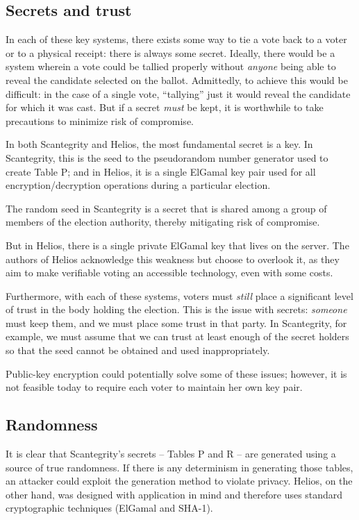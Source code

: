 \documentclass[10pt,twocolumn]{article}
\begin{document}
\subsection{Secrets and trust}

In each of these key systems, there exists some way to tie a vote back to a voter or to a physical
receipt: there is always some secret. Ideally, there would be a system wherein a vote could be
tallied properly without \emph{anyone} being able to reveal the candidate selected on the ballot.
Admittedly, to achieve this would be difficult: in the case of a single vote, ``tallying'' just it
would reveal the candidate for which it was cast. But if a secret \emph{must} be kept, it is
worthwhile to take precautions to minimize risk of compromise.

In both Scantegrity and Helios, the most fundamental secret is a key. In Scantegrity, this is the
seed to the pseudorandom number generator used to create Table P; and in Helios, it is a single
ElGamal key pair used for all encryption/decryption operations during a particular election.

The random seed in Scantegrity is a secret that is shared among a group of members of the election
authority, thereby mitigating risk of compromise.

But in Helios, there is a single private ElGamal key that lives on the server. The
authors of Helios acknowledge this weakness but choose to overlook it, as they aim to make
verifiable voting an accessible technology, even with some costs.

Furthermore, with each of these systems, voters must \emph{still} place a significant level of trust
in the body holding the election. This is the issue with secrets: \emph{someone} must keep them, and
we must place some trust in that party. In Scantegrity, for example, we must assume that we can
trust at least enough of the secret holders so that the seed cannot be obtained and used
inappropriately.

Public-key encryption could potentially solve some of these issues; however, it is not feasible
today to require each voter to maintain her own key pair.

\subsection{Randomness}

It is clear that Scantegrity's secrets -- Tables P and R -- are generated using a source of true
randomness. If there is any determinism in generating those tables, an attacker could exploit the
generation method to violate privacy. Helios, on the other hand, was designed with application in
mind and therefore uses standard cryptographic techniques (ElGamal and SHA-1).
\end{document}
